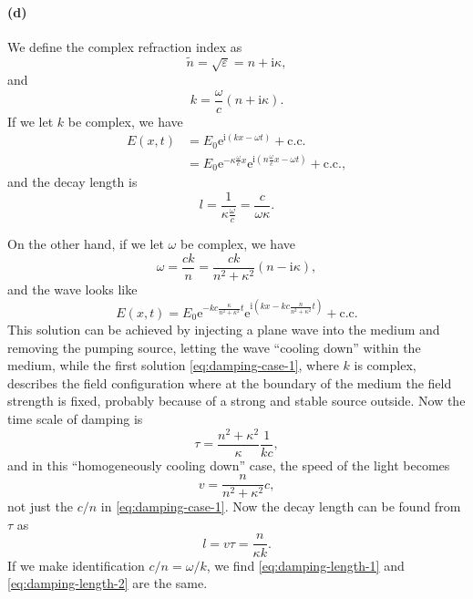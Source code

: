 \documentclass[hyperref, a4paper]{article}
\newcommand*{\ii}{\mathrm{i}}
\newcommand*{\ee}{\mathrm{e}}
\begin{document}
\paragraph{(d)} We define the complex refraction index as 
\begin{equation}
    \tilde{n} = \sqrt{\varepsilon} = n + \ii \kappa,
\end{equation}
and 
\begin{equation}
    k = \frac{\omega}{c} (n + \ii \kappa).
\end{equation}
If we let $k$ be complex, we have 
\begin{equation}
    \begin{aligned}
        E(x, t) &= E_0 \ee^{\ii (kx - \omega t)} + \text{c.c.} \\
        &= E_0 \ee^{- \kappa \frac{\omega}{c} x} \ee^{\ii \left(
            n \frac{\omega}{c} x - \omega t
        \right)} + \text{c.c.},
    \end{aligned}
    \label{eq:damping-case-1}
\end{equation} 
and the decay length is 
\begin{equation}
    l = \frac{1}{\kappa \frac{\omega}{c}}
    = \frac{c}{\omega \kappa}  .
    \label{eq:damping-length-1}
\end{equation}

On the other hand, if we let $\omega$ be complex, 
we have 
\begin{equation}
    \omega = \frac{ck}{n} = \frac{ck}{n^2 + \kappa^2} (n - \ii \kappa),
\end{equation}
and the wave looks like 
\begin{equation}
    E(x, t) = E_0 \ee^{
        - k c \frac{\kappa}{n^2 + \kappa^2} t 
    } \ee^{
        \ii \left(
            kx - k c \frac{n}{n^2 + \kappa^2} t
        \right)
    } + \text{c.c.}
\end{equation}
This solution can be achieved by injecting a plane wave into the medium 
and removing the pumping source, 
letting the wave ``cooling down'' within the medium,
while the first solution \eqref{eq:damping-case-1}, where $k$ is complex, 
describes the field configuration where at the boundary of the medium 
the field strength is fixed, 
probably because of a strong and stable source outside.
Now the time scale of damping is 
\begin{equation}
    \tau = \frac{n^2 + \kappa^2}{\kappa} \frac{1}{kc},
\end{equation}
and in this ``homogeneously cooling down'' case, 
the speed of the light becomes 
\begin{equation}
    v = \frac{n}{n^2 + \kappa^2} c,
\end{equation}
not just the $c / n$ in \eqref{eq:damping-case-1}.
Now the decay length can be found from $\tau$ as 
\begin{equation}
    l = v \tau = \frac{n}{\kappa k}.
    \label{eq:damping-length-2}
\end{equation}
If we make identification $c / n = \omega / k$,
we find \eqref{eq:damping-length-1} and \eqref{eq:damping-length-2} are the same.
\end{document}
